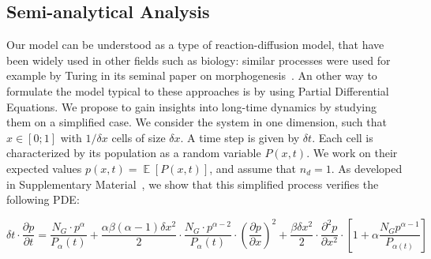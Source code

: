 \documentclass[10pt,letterpaper]{article}
\DeclareMathOperator{\E}{\mathbb{E}}
\newcommand{\Eb}[1]{\ensuremath{\E\!\left[#1\right]}}
\begin{document}
\subsection*{Semi-analytical Analysis}\label{subsec:analytical}

Our model can be understood as a type of reaction-diffusion model, that have been widely used in other fields such as biology: similar processes were used for example by Turing in its seminal paper on morphogenesis~\cite{turing1952chemical}. An other way to formulate the model typical to these approaches is by using Partial Differential Equations. We propose to gain insights into long-time dynamics by studying them on a simplified case. We consider the system in one dimension, such that $x\in \left[0;1\right]$ with $1/\delta x$ cells of size $\delta x$. A time step is given by $\delta t$. Each cell is characterized by its population as a random variable $P(x,t)$. We work on their expected values $p(x,t) = \Eb{P(x,t)}$, and assume that $n_d=1$. As developed in Supplementary Material~, we show that this simplified process verifies the following PDE:

\begin{equation}\label{eq:pde}
\delta t \cdot \frac{\partial p}{\partial t} = \frac{N_G \cdot p^{\alpha}}{P_{\alpha}(t)} + \frac{\alpha \beta (\alpha - 1) \delta x^2}{2}\cdot \frac{N_G \cdot p^{\alpha-2}}{P_{\alpha}(t)} \cdot \left(\frac{\partial p}{\partial x}\right)^2 + \frac{\beta \delta x^2}{2} \cdot \frac{\partial^2 p}{\partial x^2} \cdot\left[ 1 + \alpha \frac{N_G p^{\alpha - 1}}{P_{\alpha(t)}} \right]
\end{equation}
\end{document}
